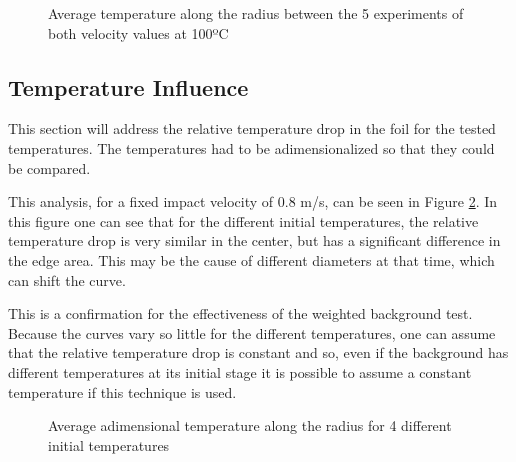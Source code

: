 \begin{figure}[h]
\centering



\caption{Average temperature along the radius between the 5 experiments of both velocity values at 100ºC}
\label{fig:speed1}
\end{figure}

\subsection{Temperature Influence}

\par This section will address the relative temperature drop in the foil for the tested temperatures. The temperatures had to be adimensionalized  so that they could be compared. \\

\par This analysis, for a fixed impact velocity of 0.8 m/s, can be seen in Figure \ref{fig:temp}. In this figure one can see that for the different initial temperatures, the relative temperature drop is very similar in the center, but has a significant difference in the edge area. This may be the cause of different diameters at that time, which can shift the curve.

\par This is a confirmation for the effectiveness of the  weighted background test. Because the curves vary so little for the different temperatures, one can assume that the relative temperature drop is constant and so, even if the background has different temperatures at its initial stage it is possible to assume a constant temperature if this technique is used.

\begin{figure}[h]
\centering



\caption{Average adimensional temperature along the radius for 4 different initial temperatures}
\label{fig:temp}
\end{figure}





